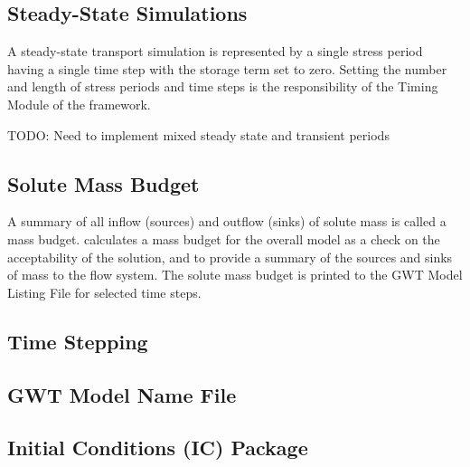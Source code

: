 \subsection{Steady-State Simulations}
A steady-state transport simulation is represented by a single stress period having a single time step with the storage term set to zero. Setting the number and length of stress periods and time steps is the responsibility of the Timing Module of the \mf framework.

TODO: Need to implement mixed steady state and transient periods

\subsection{Solute Mass Budget}
A summary of all inflow (sources) and outflow (sinks) of solute mass is called a mass budget.  \mf calculates a mass budget for the overall model as a check on the acceptability of the solution, and to provide a summary of the sources and sinks of mass to the flow system.  The solute mass budget is printed to the GWT Model Listing File for selected time steps.

\subsection{Time Stepping}


\newpage
\subsection{GWT Model Name File}


%

%

%

\newpage
\subsection{Initial Conditions (IC) Package}


